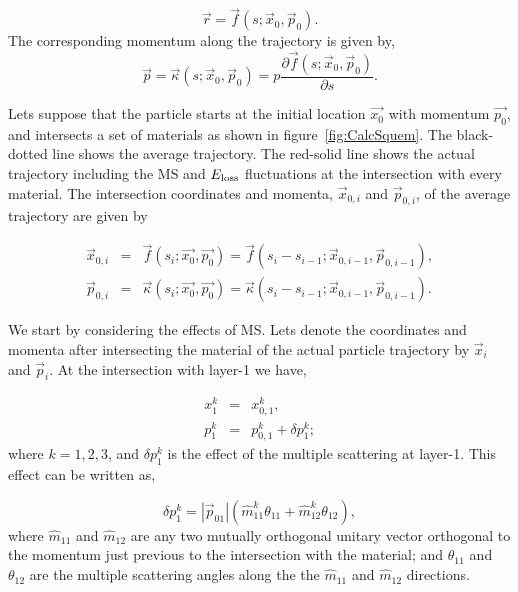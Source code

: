 \begin{equation}
  \vec{r} = \vec{f}(s;\vec{x}_0,\vec{p}_0).
\end{equation}
\noindent
The corresponding momentum along the trajectory is given by,
\begin{equation}
  \vec{p} = \vec{\kappa}(s;\vec{x}_0,\vec{p}_0) = p\frac{\partial \vec{f}(s;\vec{x}_0,\vec{p}_0)}{\partial s}.
\end{equation}

Lets suppose that the particle starts at the initial location $\vec{x_0}$ with momentum $\vec{p_0}$, and intersects a set of materials as 
shown in figure~\ref{fig:CalcSquem}. The black-dotted line shows the average trajectory. The red-solid line shows the actual trajectory
including the MS and $E_{\rm loss}$ fluctuations at the intersection with every material. The intersection coordinates and momenta, 
$\vec{x}_{0,i}$ and $\vec{p}_{0,i}$, of the average trajectory are given by

\begin{eqnarray}
  \vec{x}_{0,i} &=& \vec{f}(s_i;\vec{x_0},\vec{p_0})      = \vec{f}(s_i - s_{i-1};\vec{x}_{0,i-1},\vec{p}_{0,i-1}), \\
  \vec{p}_{0,i} &=& \vec{\kappa}(s_i;\vec{x_0},\vec{p_0}) = \vec{\kappa}(s_i - s_{i-1};\vec{x}_{0,i-1},\vec{p}_{0,i-1}).
\end{eqnarray}
\noindent

We start by considering the effects of MS. Lets denote the coordinates and momenta after intersecting the material of the actual particle trajectory by 
$\vec{x}_{i}$ and $\vec{p}_{i}$. At the intersection with layer-1 we have,

\begin{eqnarray}
  x^{k}_{1} &=& x^{k}_{0,1}, \\
  p^{k}_{1} &=& p^{k}_{0,1} + \delta p^{k}_{1};
\end{eqnarray}
\noindent
where $k=1,2,3$, and $\delta p^k_{1}$ is the effect of the multiple scattering at layer-1. This effect can be written as,

\begin{equation}
  \delta p^{k}_{1} = |\vec{p}_{01}|(\hat{m}^{k}_{11}\theta_{11} + \hat{m}^{k}_{12}\theta_{12}),
\end{equation}
\noindent
where $\hat{m}_{11}$ and $\hat{m}_{12}$ are any two mutually orthogonal unitary vector orthogonal to the momentum just 
previous to the intersection with the material; and $\theta_{11}$ and $\theta_{12}$ are the multiple scattering angles 
along the the $\hat{m}_{11}$ and $\hat{m}_{12}$ directions.

